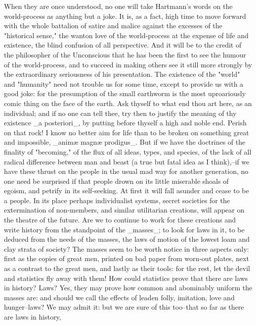 When they are once understood, no one will take Hartmann's words on
the world-process as anything but a joke. It is, as a fact, high time
to move forward with the whole battalion of satire and malice against
the excesses of the "historical sense," the wanton love of the
world-process at the expense of life and existence, the blind
confusion of all perspective. And it will be to the credit of the
philosopher of the Unconscious that he has been the first to see the
humour of the world-process, and to succeed in making others see it
still more strongly by the extraordinary seriousness of his
presentation. The existence of the "world" and "humanity" need not
trouble us for some time, except to provide us with a good joke: for
the presumption of the small earthworm is the most uproariously comic
thing on the face of the earth. Ask thyself to what end thou art
here, as an individual; and if no one can tell thee, try then to
justify the meaning of thy existence _a posteriori_, by putting
before thyself a high and noble end. Perish on that rock! I know no
better aim for life than to be broken on something great and
impossible, _animæ magnæ prodigus_. But if we have the doctrines of
the finality of "becoming," of the flux of all ideas, types, and
species, of the lack of all radical difference between man and beast
(a true but fatal idea as I think),--if we have these thrust on the
people in the usual mad way for another generation, no one need be
surprised if that people drown on its little miserable shoals of
egoism, and petrify in its self-seeking. At first it will fall
asunder and cease to be a people. In its place perhaps individualist
systems, secret societies for the extermination of non-members, and
similar utilitarian creations, will appear on the theatre of the
future. Are we to continue to work for these creations and write
history from the standpoint of the _masses_; to look for laws in it,
to be deduced from the needs of the masses, the laws of motion of the
lowest loam and clay strata of society? The masses seem to be worth
notice in three aspects only: first as the copies of great men,
printed on bad paper from worn-out plates, next as a contrast to the
great men, and lastly as their tools: for the rest, let the devil and
statistics fly away with them! How could statistics prove that there
are laws in history? Laws? Yes, they may prove how common and
abominably uniform the masses are: and should we call the effects of
leaden folly, imitation, love and hunger--laws? We may admit it: but
we are sure of this too--that so far as there are laws in history,
